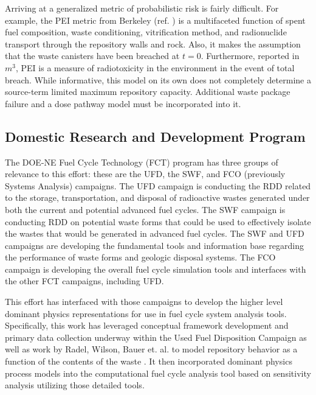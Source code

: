 Arriving at a generalized metric of probabilistic risk is fairly difficult. For 
example, the \gls{PEI} metric from Berkeley (ref.  
\cite{bouvier_comparison_2007}) is a multifaceted function of spent fuel 
composition, waste conditioning, vitrification method, and radionuclide 
transport through the repository walls and rock.  Also, it makes the assumption 
that the waste canisters have been breached at $t=0$. Furthermore, reported in 
$m^3$, PEI is a measure of radiotoxicity in the environment in the event of 
total breach. While informative, this model on its own does not completely 
determine a source-term limited maximum repository capacity.  Additional waste 
package failure and a dose pathway model must be incorporated into it.


\subsection{Domestic Research and Development Program}

The DOE-NE Fuel Cycle Technology (FCT) program has three groups of relevance to 
this effort: these are the \gls{UFD}, the \gls{SWF}, and \gls{FCO} (previously 
Systems Analysis) campaigns.  
The \gls{UFD} campaign is conducting the \gls{RDD} related to the storage, 
transportation, and disposal of radioactive wastes generated under both the 
current and potential advanced fuel cycles.  The SWF campaign is conducting 
\gls{RDD} on potential waste forms that could be used to effectively isolate the 
wastes that would be generated in advanced fuel cycles.  The \gls{SWF} and
\gls{UFD} campaigns are developing the fundamental tools and information base 
regarding the performance of waste forms and geologic disposal systems.  The 
\gls{FCO} campaign is developing the overall fuel cycle simulation tools and 
interfaces with the other FCT campaigns, including \gls{UFD}.  

This effort has interfaced with those campaigns to develop the higher level
dominant physics representations for use in fuel cycle system analysis tools.
Specifically, this work has leveraged conceptual framework development and
primary data collection underway within the Used Fuel Disposition Campaign as
well as work by Radel, Wilson, Bauer et. al. to model repository behavior as a
function of the contents of the waste \cite{radel_effect_2007}.  It then 
incorporated dominant physics process models into the \Cyclus computational 
fuel cycle analysis tool \cite{huff_cyclus:_2010} based on sensitivity analysis 
utilizing those detailed tools.

